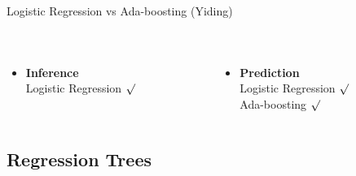 \documentclass[table]{beamer}\usepackage[]{graphicx}\usepackage[]{color}
\begin{document}
\begin{frame}{Logistic Regression vs Ada-boosting (Yiding)}
\begin{columns}[t]
\begin{column}[t]{8cm}
\begin{table}[ht]
{\begin{tabular}{cccc|c}
\end{tabular}
}
\end{table}
\end{column}
\end{columns}


\begin{minipage}{\textwidth}
{\fontsize{0.3cm}{1em}\selectfont
\begin{columns}[t]


\begin{column}[t]{4cm}
\begin{itemize}
\item \textbf{Inference}\\
Logistic Regression $\surd$
\end{itemize}
\end{column}


\begin{column}[t]{8cm}
\begin{itemize}
\item \textbf{Prediction}\\
Logistic Regression $\surd$\\
Ada-boosting $\surd$
\end{itemize}
\end{column}


\end{columns}
}
\end{minipage}


\end{frame}


\subsection{Regression Trees}

\end{document}
